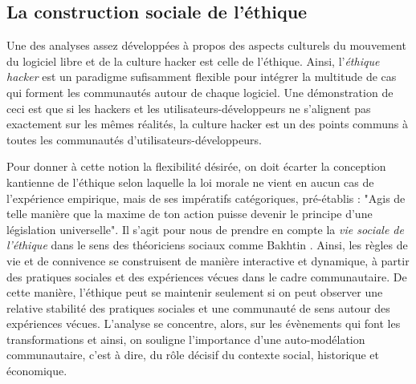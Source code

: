 \subsection{La construction sociale de l'éthique} \label{2.1.2}

Une des analyses assez développées à propos des aspects culturels du mouvement du logiciel libre et de la culture hacker est celle de l'éthique. Ainsi, l'\emph{éthique hacker} est un paradigme sufisamment flexible pour intégrer la multitude de cas qui forment les communautés autour de chaque logiciel. Une démonstration de ceci est que si les hackers et les utilisateurs-développeurs ne s'alignent pas exactement sur les mêmes réalités, la culture hacker est un des points communs à toutes les communautés d'utilisateurs-développeurs.

Pour donner à cette notion la flexibilité désirée, on doit écarter la conception kantienne de l'éthique selon laquelle la loi morale ne vient en aucun cas de l'expérience empirique, mais de ses impératifs catégoriques, pré-établis : "Agis de telle manière que la maxime de ton action puisse devenir le principe d'une législation universelle". Il s'agit pour nous de prendre en compte la \emph{vie sociale de l'éthique} dans le sens des théoriciens sociaux comme Bakhtin \citep{Bakhtin1984, Bakhtin1993}. Ainsi, les règles de vie et de connivence se construisent de manière interactive et dynamique, à partir des pratiques sociales et des expériences vécues dans le cadre communautaire. De cette manière, l'éthique peut se maintenir seulement si on peut observer une relative stabilité des pratiques sociales et une communauté de sens autour des expériences vécues. L'analyse se concentre, alors, sur les évènements qui font les transformations et ainsi, on souligne l'importance d'une auto-modélation communautaire, c'est à dire, du rôle décisif du contexte social, historique et économique.

